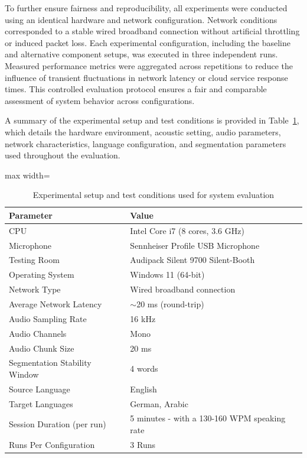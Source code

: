To further ensure fairness and reproducibility, all experiments were conducted using an identical hardware and network configuration. Network conditions corresponded to a stable wired broadband connection without artificial throttling or induced packet loss. Each experimental configuration, including the baseline and alternative component setups, was executed in three independent runs. Measured performance metrics were aggregated across repetitions to reduce the influence of transient fluctuations in network latency or cloud service response times. This controlled evaluation protocol ensures a fair and comparable assessment of system behavior across configurations.

A summary of the experimental setup and test conditions is provided in Table~\ref{tab:test_conditions}, which details the hardware environment, acoustic setting, audio parameters, network characteristics, language configuration, and segmentation parameters used throughout the evaluation.

\begin{table}[!htbp]
  \centering
  \caption[Test conditions and experimental setup]{Experimental setup and test conditions used for system evaluation}
    \label{tab:test_conditions}
  \begin{adjustbox}{max width=\textwidth}
    \begin{tabular}{p{5cm} p{7.3cm}}
      \toprule
      \textbf{Parameter} & \textbf{Value} \\
      \midrule
      CPU & Intel Core i7 (8 cores, 3.6 GHz) \\
      \midrule
      Microphone & Sennheiser Profile USB Microphone \\
      \midrule
      Testing Room & Audipack Silent 9700 Silent-Booth \\
      \midrule
      Operating System & Windows 11 (64-bit) \\
      \midrule
      Network Type & Wired broadband connection \\
      \midrule
      Average Network Latency & $\sim$20 ms (round-trip) \\
      \midrule
      Audio Sampling Rate & 16 kHz \\
      \midrule
      Audio Channels & Mono \\
      \midrule
      Audio Chunk Size & 20 ms \\
      \midrule
      Segmentation Stability Window & 4 words \\
      \midrule
      Source Language & English \\
      \midrule
      Target Languages & German, Arabic \\
      \midrule
      Session Duration (per run) & 5 minutes - with a 130-160 WPM speaking rate\\
      \midrule
      Runs Per Configuration & 3 Runs \\
      \bottomrule
    \end{tabular}
  \end{adjustbox}
\end{table}


